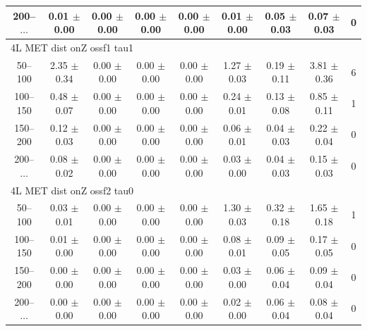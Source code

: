 \begin{table}[htp]
\begin{center}
\begin{tabular}{|c|cccccc|c|c|}
200--$\dots$ & 0.01 $\pm$ 0.00 & 0.00 $\pm$ 0.00 & 0.00 $\pm$ 0.00 & 0.00 $\pm$ 0.00 & 0.01 $\pm$ 0.00 & 0.05 $\pm$ 0.03 & 0.07 $\pm$ 0.03 & 0 \\
\hline\hline
\multicolumn{9}{l}{4L MET dist onZ ossf1 tau1}\\\hline\hline
50--100 & 2.35 $\pm$ 0.34 & 0.00 $\pm$ 0.00 & 0.00 $\pm$ 0.00 & 0.00 $\pm$ 0.00 & 1.27 $\pm$ 0.03 & 0.19 $\pm$ 0.11 & 3.81 $\pm$ 0.36 & 6 \\
100--150 & 0.48 $\pm$ 0.07 & 0.00 $\pm$ 0.00 & 0.00 $\pm$ 0.00 & 0.00 $\pm$ 0.00 & 0.24 $\pm$ 0.01 & 0.13 $\pm$ 0.08 & 0.85 $\pm$ 0.11 & 1 \\
150--200 & 0.12 $\pm$ 0.03 & 0.00 $\pm$ 0.00 & 0.00 $\pm$ 0.00 & 0.00 $\pm$ 0.00 & 0.06 $\pm$ 0.01 & 0.04 $\pm$ 0.03 & 0.22 $\pm$ 0.04 & 0 \\
200--$\dots$ & 0.08 $\pm$ 0.02 & 0.00 $\pm$ 0.00 & 0.00 $\pm$ 0.00 & 0.00 $\pm$ 0.00 & 0.03 $\pm$ 0.00 & 0.04 $\pm$ 0.03 & 0.15 $\pm$ 0.03 & 0 \\
\hline\hline
\multicolumn{9}{l}{4L MET dist onZ ossf2 tau0}\\\hline\hline
50--100 & 0.03 $\pm$ 0.01 & 0.00 $\pm$ 0.00 & 0.00 $\pm$ 0.00 & 0.00 $\pm$ 0.00 & 1.30 $\pm$ 0.03 & 0.32 $\pm$ 0.18 & 1.65 $\pm$ 0.18 & 1 \\
100--150 & 0.01 $\pm$ 0.00 & 0.00 $\pm$ 0.00 & 0.00 $\pm$ 0.00 & 0.00 $\pm$ 0.00 & 0.08 $\pm$ 0.01 & 0.09 $\pm$ 0.05 & 0.17 $\pm$ 0.05 & 0 \\
150--200 & 0.00 $\pm$ 0.00 & 0.00 $\pm$ 0.00 & 0.00 $\pm$ 0.00 & 0.00 $\pm$ 0.00 & 0.03 $\pm$ 0.00 & 0.06 $\pm$ 0.04 & 0.09 $\pm$ 0.04 & 0 \\
200--$\dots$ & 0.00 $\pm$ 0.00 & 0.00 $\pm$ 0.00 & 0.00 $\pm$ 0.00 & 0.00 $\pm$ 0.00 & 0.02 $\pm$ 0.00 & 0.06 $\pm$ 0.04 & 0.08 $\pm$ 0.04 & 0 \\
\hline\hline
\end{tabular}
\end{center}
\end{table}